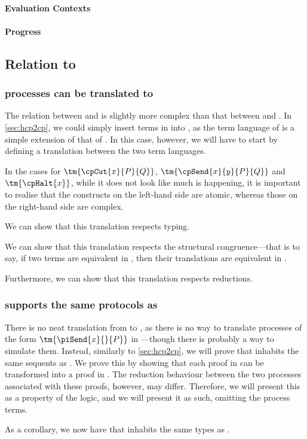 \documentclass{article}
\begin{document}
\paragraph{Evaluation Contexts}\label{sec:hccp-evaluation-contexts}





\paragraph{Progress}\label{sec:hccp-progress}


\subsection{Relation to \hcp}\label{sec:hcp2hccp}
\subsubsection{\hcp processes can be translated to \hccp}
The relation between \hccp and \hcp is slightly more complex than that between
\hcp and \cp.
In \cref{sec:hcp2cp}, we could simply insert terms in \cp into \hcp, as the term
language of \hcp is a simple extension of that of \cp.
In this case, however, we will have to start by defining a translation between
the two term languages.

In the cases for $\tm{\cpCut{x}{P}{Q}}$, $\tm{\cpSend{x}{y}{P}{Q}}$ and
$\tm{\cpHalt{x}}$, while it does not look like much is happening, it is
important to realise that the constructs on the left-hand side are atomic,
whereas those on the right-hand side are complex. 

We can show that this translation respects typing.


We can show that this translation respects the structural congruence---that is
to say, if two terms are equivalent in \hcp, then their translations are
equivalent in \hccp.


Furthermore, we can show that this translation respects reductions.



\subsubsection{\hccp supports the same protocols as \hcp}\label{sec:hccp2hcp}
There is no neat translation from \hccp to \hcp, as there is no way to translate
processes of the form $\tm{\piSend{x}{}{P}}$ in \hcp---though there is probably
a way to simulate them.
Instead, similarly to \cref{sec:hcp2cp}, we will prove that \hccp inhabits the
same sequents as \hcp.
We prove this by showing that each proof in \hccp can be transformed into a
proof in \hcp.
The reduction behaviour between the two processes associated with these proofs,
however, may differ.
Therefore, we will present this as a property of the logic, and we will present
it as such, omitting the process terms.

As a corollary, we now have that \hccp inhabits the same types as \cp.
\end{document}
